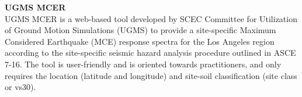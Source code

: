 \noindent\textbf{UGMS MCER} \\UGMS MCER \citep{crouse2018sitespecific} is a web-based tool developed by SCEC Committee for Utilization of Ground Motion Simulations (UGMS) to provide a site-specific Maximum Considered Earthquake (MCE) response spectra for the Los Angeles region according to the site-specific seismic hazard analysis procedure outlined in ASCE 7-16. The tool is user-friendly and is oriented towards practitioners, and only requires the location (latitude and longitude) and site-soil classification (site class or vs30).

%
